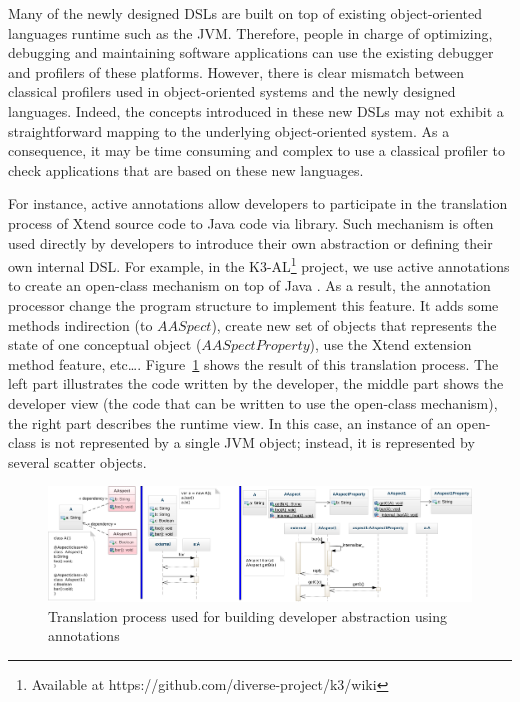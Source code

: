 Many of the newly designed DSLs are built on top of existing object-oriented languages runtime such as the JVM. 
Therefore, people in charge of optimizing, debugging and maintaining software applications can use the existing debugger and profilers of these platforms. 
However, there is clear mismatch between classical profilers used in object-oriented systems and the newly designed languages. 
Indeed, the concepts introduced in these new DSLs may not exhibit a straightforward mapping to the underlying object-oriented system.
As a consequence, it may be time consuming and complex to use a classical profiler to check applications that are based on these new languages.

For instance, active annotations allow developers to participate in the translation process of Xtend source code to Java code via library.
Such mechanism is often used directly by developers to introduce their own abstraction or defining their own internal DSL. 
For example, in the K3-AL\footnote{Available at https://github.com/diverse-project/k3/wiki} project, we use active annotations to create an open-class mechanism on top of Java \cite{Clifton:2000:MMO:353171.353181}. 
As a result, the annotation processor change the program structure to implement this feature. 
It adds some methods indirection (to $AASpect$), create new set of objects that represents the state of one conceptual object ($AASpectProperty$), use the Xtend extension method feature, etc\dots.
Figure~\ref{fig:k3-diagram} shows the result of this translation process. 
The left part illustrates the code written by the developer, the middle part shows the developer view (the code that can be written to use the open-class mechanism), the right part describes the runtime view.
In this case, an instance of an open-class is not represented by a single JVM object; instead, it is represented by several scatter objects.  

\begin{figure}
\centering
\includegraphics[width=0.9\linewidth]{chapter2/fig/famous}
\caption{Translation process used for building developer abstraction using annotations}
\label{fig:k3-diagram}
\end{figure}

